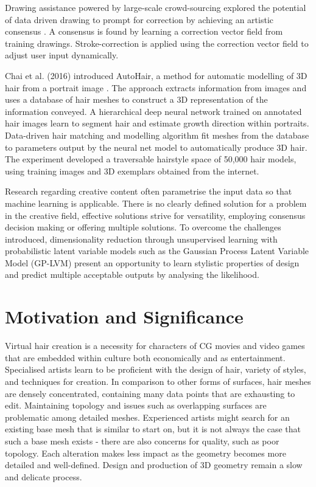 \documentclass[ %
author={Dillon Keith Diep},
supervisor={Dr. Carl Henrik Ek},
degree={MEng},
title={ART-CG Hair:},
subtitle={Assisted Real-time Content Generation of Stylised Virtual Hair},
type={Research},
year={2017} ]{dissertation}
\begin{document}
Drawing assistance powered by large-scale crowd-sourcing explored the potential of data driven drawing to prompt for correction by achieving an artistic consensus \cite{drawingassistance}. A consensus is found by learning a correction vector field from training drawings. Stroke-correction is applied using the correction vector field to adjust user input dynamically.

Chai et al. (2016) introduced AutoHair, a method for automatic modelling of 3D hair from a portrait image \cite{autohair}. The approach extracts information from images and uses a database of hair meshes to construct a 3D representation of the information conveyed. A hierarchical deep neural network trained on annotated hair images learn to segment hair and estimate growth direction within portraits. Data-driven hair matching and modelling algorithm fit meshes from the database to parameters output by the neural net model to automatically produce 3D hair. The experiment developed a traversable hairstyle space of 50,000 hair models, using training images and 3D exemplars obtained from the internet.

Research regarding creative content often parametrise the input data so that machine learning is applicable. There is no clearly defined solution for a problem in the creative field, effective solutions strive for versatility, employing consensus decision making or offering multiple solutions. To overcome the challenges introduced, dimensionality reduction through unsupervised learning with probabilistic latent variable models such as the Gaussian Process Latent Variable Model (GP-LVM) \cite{gplvm} present an opportunity to learn stylistic properties of design and predict multiple acceptable outputs by analysing the likelihood.

\section{Motivation and Significance}
Virtual hair creation is a necessity for characters of CG movies and video games that are embedded within culture both economically and as entertainment. Specialised artists learn to be proficient with the design of hair, variety of styles, and techniques for creation. In comparison to other forms of surfaces, hair meshes are densely concentrated, containing many data points that are exhausting to edit. Maintaining topology and issues such as overlapping surfaces are problematic among detailed meshes. Experienced artists might search for an existing base mesh that is similar to start on, but it is not always the case that such a base mesh exists - there are also concerns for quality, such as poor topology. Each alteration makes less impact as the geometry becomes more detailed and well-defined. Design and production of 3D geometry remain a slow and delicate process.
\end{document}
